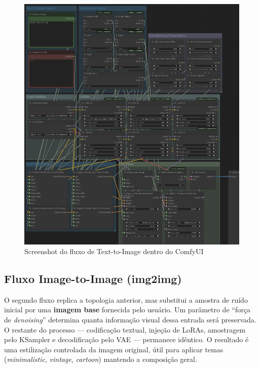 \documentclass[12pt, %
openright, 
oneside, %
a4paper,    %
brazil]{facom-ufu-abntex2}
\begin{document}
\begin{figure}[H]
    \centering
	\includegraphics[width=\linewidth]{figuras/text2img-flow.png}
	\caption[Fluxo Text-to-Image (ComfyUI)]{Screenshot do fluxo de Text-to-Image dentro do ComfyUI}
	\label{fig:text2imgFlow}
\end{figure}

\subsection{Fluxo Image-to-Image (img2img)}

O segundo fluxo replica a topologia anterior, mas substitui a amostra de ruído inicial por uma \textbf{imagem base} fornecida pelo usuário. Um parâmetro de ``força de \emph{denoising}'' determina quanta informação visual dessa entrada será preservada. O restante do processo — codificação textual, injeção de LoRAs, amostragem pelo KSampler e decodificação pelo VAE — permanece idêntico. O resultado é uma estilização controlada da imagem original, útil para aplicar temas (\emph{minimalistic}, \emph{vintage}, \emph{cartoon}) mantendo a composição geral.
\end{document}
